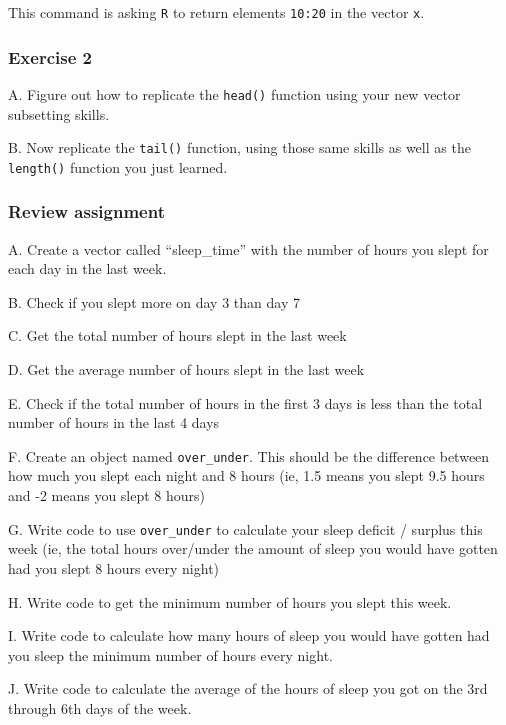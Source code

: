 \documentclass[
]{book}
\begin{document}
This command is asking \texttt{R} to return elements \texttt{10:20} in the vector \texttt{x}.

\hypertarget{exercise-2-3}{%
\subsubsection*{Exercise 2}\label{exercise-2-3}}

A. Figure out how to replicate the \texttt{head()} function using your new vector subsetting skills.

B. Now replicate the \texttt{tail()} function, using those same skills as well as the \texttt{length()} function you just learned.

\hypertarget{review-assignment-3}{%
\subsubsection*{Review assignment}\label{review-assignment-3}}

A. Create a vector called ``sleep\_time'' with the number of hours you slept for each day in the last week.

B. Check if you slept more on day 3 than day 7

C. Get the total number of hours slept in the last week

D. Get the average number of hours slept in the last week

E. Check if the total number of hours in the first 3 days is less than the total number of hours in the last 4 days

F. Create an object named \texttt{over\_under}. This should be the difference between how much you slept each night and 8 hours (ie, 1.5 means you slept 9.5 hours and -2 means you slept 8 hours)

G. Write code to use \texttt{over\_under} to calculate your sleep deficit / surplus this week (ie, the total hours over/under the amount of sleep you would have gotten had you slept 8 hours every night)

H. Write code to get the minimum number of hours you slept this week.

I. Write code to calculate how many hours of sleep you would have gotten had you sleep the minimum number of hours every night.

J. Write code to calculate the average of the hours of sleep you got on the 3rd through 6th days of the week.
\end{document}
